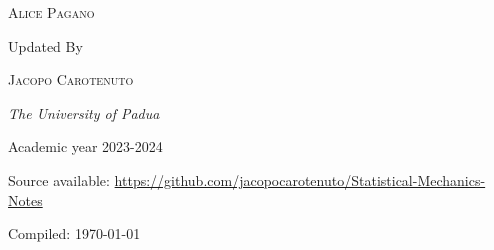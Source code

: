 \begin{titlepage}
	{\scshape\Large Alice Pagano \\} %
	
	\vspace{0.5\baselineskip} %
	
	Updated By
	
	\vspace{0.5\baselineskip} %
	
	{\scshape\Large Jacopo Carotenuto \\} %
	
	\vspace{0.5\baselineskip} %
	
	
	
	\textit{The University of Padua } %
	
	\vspace{0.5\baselineskip}
	
	\small Academic year 2023-2024
	
	\vspace{4cm}
	
	Source available: \url{https://github.com/jacopocarotenuto/Statistical-Mechanics-Notes}
	\vspace{2cm}
	
	\footnotesize Compiled: \today %
	
	\vfill %

\end{titlepage}

\clearpage{\pagestyle{empty}\cleardoublepage}
